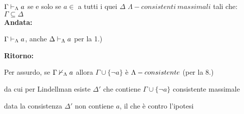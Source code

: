 $\Gamma\vdash_{\Lambda}a$ se e solo se $a\in$ a tutti i quei $\Delta$ $\Lambda-consistenti\ massimali$
tali che: $\Gamma\subseteq\Delta$\\


\textbf{Andata:}

$\Gamma\vdash_{\Lambda}a$, anche $\Delta\vdash_{\Lambda}a$ per la 1.)

\textbf{Ritorno:}

Per assurdo, se $\Gamma\nvdash_{\Lambda}a$ allora $\Gamma\cup\{\neg a\}$
è $\mbox{\ensuremath{\Lambda}}-consistente$ (per la 8.)

da cui per Lindellman esiste $\Delta'$ che contiene $\Gamma\cup\{\neg a\}$
consistente massimale

data la consistenza $\Delta'$ non contiene $a$, il che è contro
l'ipotesi \lightning
